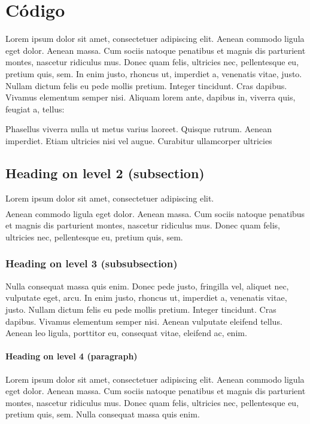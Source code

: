 \documentclass[paper=a4, fontsize=11pt]{scrartcl}
\numberwithin{equation}{section}		%
\numberwithin{figure}{section}			%
\numberwithin{table}{section}				%
\begin{document}
\section{Código}
Lorem ipsum dolor sit amet, consectetuer adipiscing elit. Aenean commodo ligula eget dolor. Aenean massa. Cum sociis natoque penatibus et magnis dis parturient montes, nascetur ridiculus mus. Donec quam felis, ultricies nec, pellentesque eu, pretium quis, sem. In enim justo, rhoncus ut, imperdiet a, venenatis vitae, justo. Nullam dictum felis eu pede mollis pretium. Integer tincidunt. Cras dapibus. Vivamus elementum semper nisi. Aliquam lorem ante, dapibus in, viverra quis, feugiat a, tellus:

Phasellus viverra nulla ut metus varius laoreet. Quisque rutrum. Aenean imperdiet. Etiam ultricies nisi vel augue. Curabitur ullamcorper ultricies 

\subsection{Heading on level 2 (subsection)}
Lorem ipsum dolor sit amet, consectetuer adipiscing elit. 
\begin{align}
\end{align}
Aenean commodo ligula eget dolor. Aenean massa. Cum sociis natoque penatibus et magnis dis parturient montes, nascetur ridiculus mus. Donec quam felis, ultricies nec, pellentesque eu, pretium quis, sem.

\subsubsection{Heading on level 3 (subsubsection)}
Nulla consequat massa quis enim. Donec pede justo, fringilla vel, aliquet nec, vulputate eget, arcu. In enim justo, rhoncus ut, imperdiet a, venenatis vitae, justo. Nullam dictum felis eu pede mollis pretium. Integer tincidunt. Cras dapibus. Vivamus elementum semper nisi. Aenean vulputate eleifend tellus. Aenean leo ligula, porttitor eu, consequat vitae, eleifend ac, enim.

\paragraph{Heading on level 4 (paragraph)}
Lorem ipsum dolor sit amet, consectetuer adipiscing elit. Aenean commodo ligula eget dolor. Aenean massa. Cum sociis natoque penatibus et magnis dis parturient montes, nascetur ridiculus mus. Donec quam felis, ultricies nec, pellentesque eu, pretium quis, sem. Nulla consequat massa quis enim. 
\end{document}
